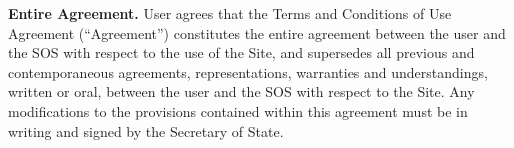 \textbf{Entire Agreement.}
User agrees that the Terms and Conditions of Use Agreement (``Agreement'')
constitutes the entire agreement between the user and the SOS with respect to
the use of the Site, and supersedes all previous and contemporaneous agreements,
representations, warranties and understandings, written or oral, between the
user and the SOS with respect to the Site. Any modifications to the provisions
contained within this agreement must be in writing and signed by the Secretary
of State.